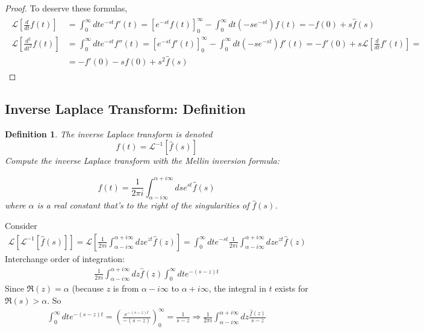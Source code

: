 \documentclass[10pt]{amsart}
\newtheorem{definition}{Definition}
\begin{document}
\begin{multicols*}{2}
\begin{proof}
To deserve these formulas,
\[
\begin{gathered}
\begin{aligned}
\mathcal{L}\left[ \frac{d}{dt} f(t) \right] & = \int_0^{\infty} dt e^{-st} f'(t) = \left[ e^{-st}f(t) \right]_0^{\infty} - \int_0^{\infty}dt (-se^{-st}) f(t) = -f(0) + s\widehat{f}(s) \\
\mathcal{L}\left[ \frac{d^2}{dt^2} f(t) \right] & = \int_0^{\infty} dt e^{-st} f''(t) = \left[ e^{-st} f'(t) \right]_0^{\infty} - \int_0^{\infty} dt (-se^{-st} ) f'(t) = -f'(0) + s \mathcal{L} [ \frac{d}{dt} f'(t) ] = \\
& = -f'(0) - sf(0 ) + s^2 \widehat{f}(s)
\end{aligned}
\end{gathered}
\]
\end{proof}

\subsection{Inverse Laplace Transform: Definition}

\begin{definition}
The inverse Laplace transform is denoted
\begin{equation}
f(t) = \mathcal{L}^{-1}[ \widehat{f}(s) ]
\end{equation}
Compute the inverse Laplace transform with the Mellin inversion formula:

\begin{equation}
f(t) = \frac{1}{2\pi i} \int_{\alpha - i \infty}^{\alpha + i \infty} ds e^{st} \widehat{f}(s)
\end{equation}
where $\alpha$ is a real constant that's to the right of the singularities of $\widehat{f}(s)$.
\end{definition}

Consider 
\[
\begin{gathered}
\mathcal{L} [ \mathcal{L}^{-1} [\widehat{f}(s)] ] =  \mathcal{L} \left[ \frac{1}{2\pi i} \int_{\alpha - i \infty}^{\alpha + i \infty} dz e^{zt} \widehat{f}(z) \right] = \int_0^{\infty} dt e^{-st} \frac{1}{2\pi i} \int_{\alpha - i \infty}^{\alpha + i \infty} dz e^{zt} \widehat{f}(z)
\end{gathered}
\]
Interchange order of integration:
\[
\begin{gathered}
\frac{1}{2\pi i} \int_{\alpha - i \infty }^{\alpha + i \infty} dz \widehat{f}(z) \int_0^{\infty} dt e^{-(s- z) t}
\end{gathered}
\]
Since $\Re{ (z)} = \alpha$ (because $z$ is from $\alpha - i \infty$ to $\alpha + i \infty$, the integral in $t$ exists for $\Re{ (s)} > \alpha$.
So
\[
\begin{gathered}
\int_0^{\infty} dt e^{-(s-z)t} =  \left( \frac{ e^{-(s-z)t} }{ -(s-z) } \right)_0^{\infty} = \frac{1}{s-z} \Longrightarrow \frac{1}{2 \pi i} \int_{\alpha - i \infty}^{\alpha + i \infty} dz \frac{\widehat{f}(z) }{ s-z}
\end{gathered}
\]


\end{multicols*}
\end{document}
